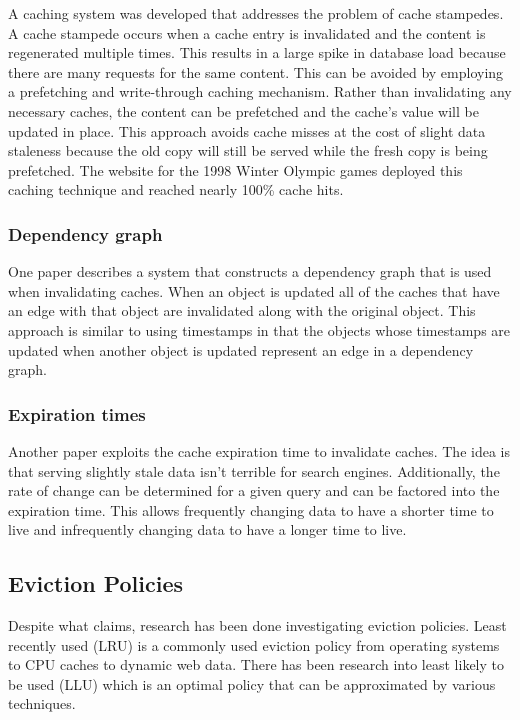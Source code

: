 \documentclass[12pt]{article}
\begin{document}
A caching system was developed that addresses the problem of cache stampedes.\cite{scalableConsistentCaching}
A cache stampede occurs when a cache entry is invalidated and the content is regenerated multiple times.
This results in a large spike in database load because there are many requests for the same content.
This can be avoided by employing a prefetching and write-through caching mechanism.
Rather than invalidating any necessary caches, the content can be prefetched and the cache's value will be updated in place.
This approach avoids cache misses at the cost of slight data staleness because the old copy will still be served while the fresh copy is being prefetched.
The website for the 1998 Winter Olympic games deployed this caching technique and reached nearly 100\% cache hits.\cite{scalableConsistentCaching}

\subsubsection{Dependency graph}
One paper describes a system that constructs a dependency graph that is used when invalidating caches.\cite{scalableConsistentCaching}
When an object is updated all of the caches that have an edge with that object are invalidated along with the original object.
This approach is similar to using timestamps in that the objects whose timestamps are updated when another object is updated represent an edge in a dependency graph.

\subsubsection{Expiration times}
Another paper exploits the cache expiration time to invalidate caches.\cite{refreshingPerspectiveSearch}
The idea is that serving slightly stale data isn't terrible for search engines.
Additionally, the rate of change can be determined for a given query and can be factored into the expiration time.
This allows frequently changing data to have a shorter time to live and infrequently changing data to have a longer time to live.

\subsection{Eviction Policies}
Despite what \cite{refreshingPerspectiveSearch} claims, research has been done investigating eviction policies.
Least recently used (LRU) is a commonly used eviction policy from operating systems to CPU caches to dynamic web data.
There has been research into least likely to be used (LLU) which is an optimal policy that can be approximated by various techniques.
\end{document}
